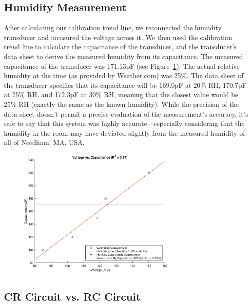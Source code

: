 \documentclass[11pt]{article}
\begin{document}
\subsection{Humidity Measurement}

After calculating our calibration trend line, we reconnected the humidity transducer and measured the voltage across it. We then used the calibration trend line to calculate the capacitance of the transducer, and the transducer's data sheet to derive the measured humidity from its capacitance. The measured capacitance of the transducer was 171.13pF (see Figure~\ref{fig:results}). The actual relative humidity at the time (as provided by Weather.com) was 25\%. The data sheet of the transducer specifies that its capacitance will be 169.0pF at 20\% RH, 170.7pF at 25\% RH, and 172.3pF at 30\% RH, meaning that the closest value would be 25\% RH (exactly the same as the known humidity). While the precision of the data sheet doesn't permit a precise evaluation of the measurement's accuracy, it's safe to say that this system was highly accurate—especially considering that the humidity in the room may have deviated slightly from the measured humidity of all of Needham, MA, USA.

\begin{figure}[H]
	\centering 
	\includegraphics[width=0.7\textwidth]{full_results.eps}
	\caption{}
	\label{fig:results}
\end{figure}


\subsection{CR Circuit vs. RC Circuit}
\end{document}
